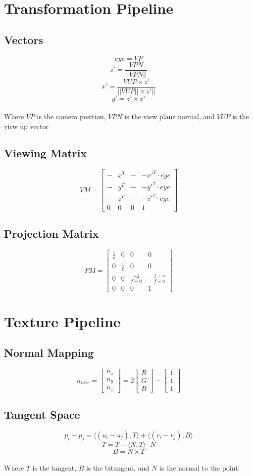 \documentclass{article}
\begin{document}
\section{Transformation Pipeline}
\subsection{Vectors}
\vspace{.3cm}
\[ eye = VP \]
\[ z' = \frac{VPN}{||VPN||} \]
\[ x' = \frac{VUP \times z'}{||VUP|| \times z'||} \]
\[ y' = z' \times x' \] \\
Where $VP$ is the camera position, $VPN$ is the view plane normal, and $VUP$ is the view up vector

\subsection{Viewing Matrix}
\vspace{.3cm}
\[ VM = \begin{bmatrix} - & x^T & - & -x'^T \cdot eye \\ - & y^T & - & -y'^T \cdot eye \\ - & z^T & - & -z'^T \cdot eye \\ 0 & 0 & 0 & 1 \end{bmatrix} \]

\subsection{Projection Matrix}
\vspace{.3cm}
\[ PM = \begin{bmatrix} \frac{1}{r} & 0 & 0 & 0 \\ 0 & \frac{1}{t} & 0 & 0 \\ 0 & 0 & \frac{-2}{f-n} & -\frac{f+n}{f-n} \\ 0 & 0 & 0 & 1 \end{bmatrix} \]

\section{Texture Pipeline}
\subsection{Normal Mapping}
\vspace{.3cm}
\[ n_{new} = \begin{bmatrix} n_x \\ n_y \\ n_z \end{bmatrix} = 2 \begin{bmatrix} R \\ G \\ B \end{bmatrix} - \begin{bmatrix} 1 \\ 1 \\ 1 \end{bmatrix} \]

\subsection{Tangent Space}
\vspace{.3cm}
\[ p_i - p_j = \langle (u_i - u_j), T \rangle + \langle (v_i - v_j), B \rangle \]
\[ T = T - \langle N, T \rangle \cdot N \]
\[ B = N \times T \] \\
Where $T$ is the tangent, $B$ is the bitangent, and $N$ is the normal to the point.
\end{document}

